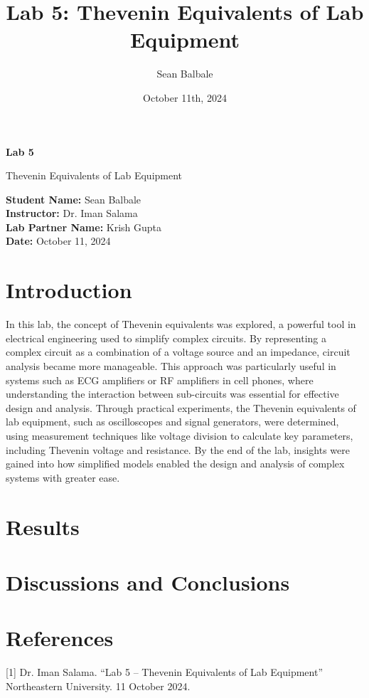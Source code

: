 \documentclass{article}
\title{Lab 5: Thevenin Equivalents of Lab Equipment}
\author{Sean Balbale}
\date{October 11th, 2024}
\begin{document}
\begin{titlepage}
	\begin{center}
		\vspace*{1in}

		\Huge
		\textbf{Lab 5}

		\LARGE
		Thevenin Equivalents of Lab Equipment

		\vspace{3 in}

		\textbf{Student Name:} Sean Balbale
		\\ \textbf{Instructor:} Dr. Iman Salama
		\\ \textbf{Lab Partner Name:} Krish Gupta
		\\ \textbf{Date:} October 11, 2024

		\vfill


	\end{center}
\end{titlepage}

\newpage


\section{Introduction}
In this lab, the concept of Thevenin equivalents was explored, a powerful tool
in electrical engineering used to simplify complex circuits. By representing a
complex circuit as a combination of a voltage source and an impedance, circuit
analysis became more manageable. This approach was particularly useful in
systems such as ECG amplifiers or RF amplifiers in cell phones, where
understanding the interaction between sub-circuits was essential for effective
design and analysis. Through practical experiments, the Thevenin equivalents of
lab equipment, such as oscilloscopes and signal generators, were determined,
using measurement techniques like voltage division to calculate key parameters,
including Thevenin voltage and resistance. By the end of the lab, insights were
gained into how simplified models enabled the design and analysis of complex
systems with greater ease.

\section{Results}


\section{Discussions and Conclusions}

\section{References}
 [1] Dr. Iman Salama. “Lab 5 – Thevenin Equivalents of Lab Equipment” Northeastern University. 11 October 2024.
\end{document}
